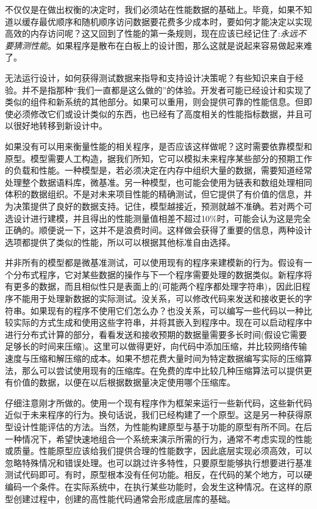 不仅仅是在做出权衡的决定时，我们必须站在性能数据的基础上。毕竟，如果不知道以缓存最优顺序和随机顺序访问数据要花费多少成本时，要如何才能决定以实现高效的内存访问呢？这又回到了性能的第一条规则，现在应该已经记住了:\textit{永远不要猜测性能}。如果程序是散布在白板上的设计图，那么这就是说起来容易做起来难了。

无法运行设计，如何获得测试数据来指导和支持设计决策呢？有些知识来自于经验。并不是指那种“我们一直都是这么做的”的体验。开发者可能已经设计和实现了类似的组件和新系统的其他部分。如果可以重用，则会提供可靠的性能信息。但即使必须修改它们或设计类似的东西，也已经有了高度相关的性能指标数据，并且可以很好地转移到新设计中。 

如果没有可以用来衡量性能的相关程序，是否应该这样做呢？这时需要依靠模型和原型。模型需要人工构造，据我们所知，它可以模拟未来程序某些部分的预期工作的负载和性能。一种模型是，若必须决定在内存中组织大量的数据，需要知道经常处理整个数据语料库，微基准。另一种模型，也可能会使用为链表和数组处理相同体积的数据组织。不是对未来项目性能的精确测试，但它提供了有价值的信息，并为决策提供了良好的数据支持。记住，模型越接近，预测就越不准确。若对两个可选设计进行建模，并且得出的性能测量值相差不超过10\%时，可能会认为这是完全正确的。顺便说一下，这并不是浪费时间。这样做会获得了重要的信息，两种设计选项都提供了类似的性能，所以可以根据其他标准自由选择。 

并非所有的模型都是微基准测试，可以使用现有的程序来建模新的行为。假设有一个分布式程序，它对某些数据的操作与下一个程序需要处理的数据类似。新程序将有更多的数据，而且相似性只是表面上的(可能两个程序都处理字符串)，因此旧程序不能用于处理新数据的实际测试。没关系，可以修改代码来发送和接收更长的字符串。如果现有的程序不使用它们怎么办？也没关系，可以编写一些代码以一种比较实际的方式生成和使用这些字符串，并将其嵌入到程序中。现在可以启动程序中进行分布式计算的部分，看看发送和接收预期的数据量需要多长时间(假设它需要足够长的时间来压缩)。这里可以做得更好，向代码中添加压缩，并比较网络传输速度与压缩和解压缩的成本。如果不想花费大量时间为特定数据编写实际的压缩算法，那么可以尝试使用现有的压缩库。在免费的库中比较几种压缩算法可以提供更有价值的数据，以便在以后根据数据量决定使用哪个压缩库。 

仔细注意刚才所做的。使用一个现有程序作为框架来运行一些新代码，这些新代码近似于未来程序的行为。换句话说，我们已经构建了一个原型。这是另一种获得原型设计性能评估的方法。当然，为性能构建原型与基于功能的原型有所不同。在后一种情况下，希望快速地组合一个系统来演示所需的行为，通常不考虑实现的性能或质量。性能原型应该给我们提供合理的性能数字，因此底层实现必须高效，可以忽略特殊情况和错误处理。也可以跳过许多特性，只要原型能够执行想要进行基准测试代码即可。有时，原型根本没有任何功能。相反，在代码的某个地方，可以硬编码一个条件。在实际系统中，在执行某些功能时，会发生这种情况。在这样的原型创建过程中，创建的高性能代码通常会形成底层库的基础。


